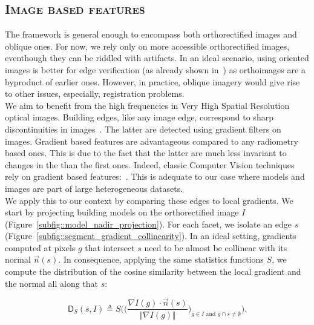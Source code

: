     \subsection{\textsc{Image based features}}
        \label{subsec::learned_evaluation::baseline::image}
        The framework is general enough to encompass both orthorectified images and oblique ones.
        For now, we rely only on more accessible orthorectified images, eventhough they can be riddled with artifacts.
        In an ideal scenario, using oriented images is better for edge verification (as already shown in~\parencite{michelin2013quality}) as orthoimages are a byproduct of earlier ones.
        However, in practice, oblique imagery would give rise to other issues, especially, registration problems.\\

        We aim to benefit from the high frequencies in Very High Spatial Resolution optical images.
        Building edges, like any image edge, correspond to sharp discontinuities in images~\parencite{ortner2007building}.
        The latter are detected using gradient filters on images.
        Gradient based features are advantageous compared to any radiometry based ones.
        This is due to the fact that the latter are much less invariant to changes in the than the first ones.
        Indeed, classic Computer Vision techniques rely on gradient based features:~\textcite{lowe2004distinctive,dalal2005histograms}.
        This is adequate to our case where models and images are part of large heterogeneous datasets.\\
        

        We apply this to our context by comparing these edges to local gradients.
        We start by projecting building models on the orthorectified image $I$ (Figure~\ref{subfig::model_nadir_projection}).
        For each facet, we isolate an edge $s$ (Figure~\ref{subfig::segment_gradient_collinearity}).
        In an ideal setting, gradients computed at pixels $g$ that intersect $s$ need to be almost be collinear with its normal $\vec{n}(s)$.
        In consequence, applying the same statistics functions $S$, we compute the distribution of the cosine similarity between the local gradient and the normal all along that $s$:
        
        \begin{equation}
            \label{eq::corr_seg}
            \mathsf{D}_S(s, I) \triangleq S \bigg( \Big(\frac{\nabla I(g) \cdot \vec{n}(s)}{\Vert \nabla I(g)\Vert}\Big)_{g \in I \textrm{ and } g \cap s \neq \emptyset} \bigg).
        \end{equation}

